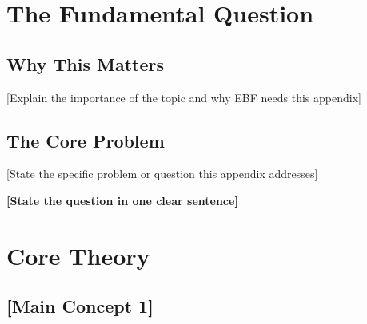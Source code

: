 %
%

\section{The Fundamental Question}
\label{sec:[code]-fundamental}


\subsection{Why This Matters}

[Explain the importance of the topic and why EBF needs this appendix]

\subsection{The Core Problem}

[State the specific problem or question this appendix addresses]

\begin{tcolorbox}[colback=red!5!white, colframe=red!75!black, 
    title=The Fundamental Question]
\textbf{[State the question in one clear sentence]}
\end{tcolorbox}


\section{Core Theory}
\label{sec:[code]-theory}


\subsection{[Main Concept 1]}

